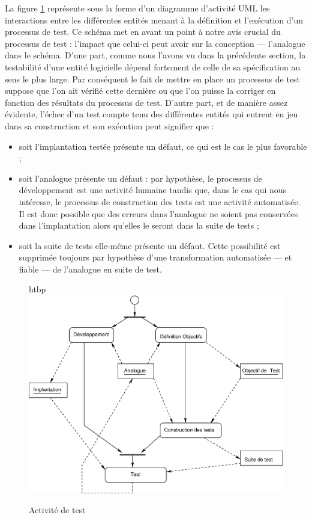 La figure \ref{fig-activite-test} repr\'esente sous la forme d'un
diagramme d'activit\'e UML les interactions entre les diff\'erentes
entit\'es menant \`a la d\'efinition et l'ex\'ecution d'un
processus de test. Ce sch\'ema met en avant un point \`a notre avis
crucial du processus de test : l'impact que celui-ci peut avoir
sur la conception --- l'analogue dans le sch\'ema. D'une
part, comme nous l'avons vu dans la pr\'ec\'edente section, la
testabilit\'e d'une entit\'e logicielle d\'epend fortement de
celle de sa sp\'ecification au sens le plus large. Par
cons\'equent le fait de mettre en place un processus de test suppose
que l'on ait v\'erifi\'e cette derni\`ere ou que l'on puisse la
corriger en fonction des r\'esultats du processus de test. D'autre
part, et de mani\`ere assez \'evidente, l'\'echec d'un test compte
tenu des diff\'erentes entit\'es qui entrent en jeu dans sa
construction et son ex\'ecution peut signifier que :
\begin{itemize}
  \item soit l'implantation test\'ee pr\'esente un d\'efaut, ce qui
  est le cas le plus \og favorable \fg  ;
\item soit l'analogue pr\'esente un d\'efaut : par hypoth\`ese, le
  processus de d\'eveloppement est une activit\'e humaine tandis
  que, dans le cas qui nous int\'eresse, le processus de construction
  des tests est une activit\'e automatis\'ee. Il est donc possible
  que des erreurs dans l'analogue ne soient pas conserv\'ees
  dans l'implantation alors qu'elles le seront dans la suite de tests ;
\item soit la  suite de tests elle-m\^eme pr\'esente un
  d\'efaut. Cette possibilit\'e est supprim\'ee toujours par
  hypoth\`ese d'une transformation automatis\'ee --- et fiable --- de
  l'analogue en suite de test.
\end{itemize}

\begin{figure}{htbp}
    \centering
    \includegraphics[width=.6\textwidth]{figures/fig-activite-test.eps}
    \caption{Activit\'e de test}
    \label{fig-activite-test}
\end{figure}


